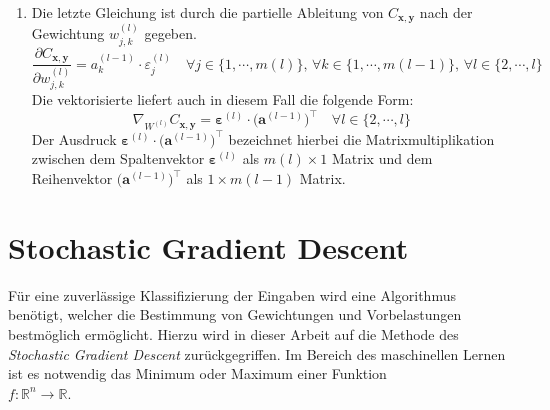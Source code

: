 \begin{enumerate}
\item Die letzte Gleichung ist durch die partielle Ableitung von $C_{\mathbf{x},\mathbf{y}}$ nach der Gewichtung $w_{j,k}^{(l)}$ gegeben.
\begin{equation}
  \label{eq:BP4}
  \frac{\partial C_{\mathbf{x}, \mathbf{y}}}{\partial w_{j,k}^{(l)}} = a_k^{(l-1)} \cdot \varepsilon_j^{(l)}
  \quad \mbox{$\forall j \in \{1,\cdots,m(l)\}$, $\forall k \in \{1,\cdots,m(l-1)\}$, $\forall l \in \{2, \cdots,l\}$}
\end{equation}
Die vektorisierte liefert auch in diesem Fall die folgende Form:
\begin{equation}
  \label{eq:BP4v}
  \nabla_{W^{(l)}} C_{\mathbf{x}, \mathbf{y}} = \boldsymbol{\varepsilon}^{(l)} \cdot \bigl(\mathbf{a}^{(l-1)}\bigr)^\top
  \quad \mbox{$\forall l \in \{2, \cdots,l\}$}
\end{equation}
Der Ausdruck $\boldsymbol{\varepsilon}^{(l)} \cdot \bigl(\mathbf{a}^{(l-1)}\bigr)^\top$ bezeichnet hierbei die Matrixmultiplikation zwischen dem Spaltenvektor $\boldsymbol{\varepsilon}^{(l)}$ als $m(l) \times 1$ Matrix und dem Reihenvektor $\bigl(\mathbf{a}^{(l-1)}\bigr)^\top$ als $1 \times m(l-1)$ Matrix.
\end{enumerate}

\section{Stochastic Gradient Descent}
Für eine zuverlässige Klassifizierung der Eingaben wird eine Algorithmus benötigt, welcher die Bestimmung von Gewichtungen und Vorbelastungen bestmöglich ermöglicht. Hierzu wird in dieser Arbeit auf die Methode des \textit{Stochastic Gradient Descent} zurückgegriffen. Im Bereich des maschinellen Lernen ist es notwendig das Minimum oder Maximum einer Funktion \\[0.2cm]
\hspace*{1.3cm}
$f:\mathbb{R}^n \rightarrow \mathbb{R}$.
\\[0.2cm]


